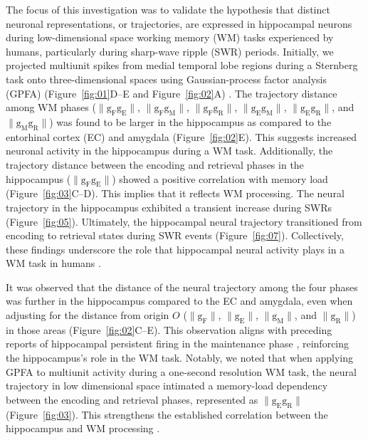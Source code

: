 \documentclass[final,3p,times,twocolumn]{elsarticle}
\begin{document}
The focus of this investigation was to validate the hypothesis that distinct neuronal representations, or trajectories, are expressed in hippocampal neurons during low-dimensional space working memory (WM) tasks experienced by humans, particularly during sharp-wave ripple (SWR) periods. Initially, we projected multiunit spikes from medial temporal lobe regions during a Sternberg task onto three-dimensional spaces using Gaussian-process factor analysis (GPFA) (Figure~\ref{fig:01}D--E and Figure~\ref{fig:02}A) \cite{yu_gaussian-process_2009}. The trajectory distance among WM phases ($\mathrm{\lVert g_{F}g_{E} \rVert}$, $\mathrm{\lVert g_{F}g_{M} \rVert}$, $\mathrm{\lVert g_{F}g_{R} \rVert}$, $\mathrm{\lVert g_{E}g_{M} \rVert}$, $\mathrm{\lVert g_{E}g_{R} \rVert}$, and $\mathrm{\lVert g_{M}g_{R} \rVert}$) was found to be larger in the hippocampus as compared to the entorhinal cortex (EC) and amygdala (Figure~\ref{fig:02}E). This suggests increased neuronal activity in the hippocampus during a WM task. Additionally, the trajectory distance between the encoding and retrieval phases in the hippocampus ($\mathrm{\lVert g_{F}g_{E} \rVert}$) showed a positive correlation with memory load (Figure~\ref{fig:03}C--D). This implies that it reflects WM processing. The neural trajectory in the hippocampus exhibited a transient increase during SWRs (Figure~\ref{fig:05}). Ultimately, the hippocampal neural trajectory transitioned from encoding to retrieval states during SWR events (Figure~\ref{fig:07}). Collectively, these findings underscore the role that hippocampal neural activity plays in a WM task in humans \cite{naber_reciprocal_2001,van_strien_anatomy_2009,strange_functional_2014}.

It was observed that the distance of the neural trajectory among the four phases was further in the hippocampus compared to the EC and amygdala, even when adjusting for the distance from origin $O$ ($\mathrm{\lVert g_{F} \rVert}$, $\mathrm{\lVert g_{E} \rVert}$, $\mathrm{\lVert g_{M} \rVert}$, and $\mathrm{\lVert g_{R} \rVert}$) in those areas (Figure~\ref{fig:02}C--E). This observation aligns with preceding reports of hippocampal persistent firing in the maintenance phase \cite{boran_persistent_2019,kaminski_persistently_2017,kornblith_persistent_2017,faraut_dataset_2018}, reinforcing the hippocampus's role in the WM task. Notably, we noted that when applying GPFA to multiunit activity during a one-second resolution WM task, the neural trajectory in low dimensional space intimated a memory-load dependency between the encoding and retrieval phases, represented as $\mathrm{\lVert g_{E}g_{R} \rVert}$ (Figure~\ref{fig:03}). This strengthens the established correlation between the hippocampus and WM processing \cite{oso_boran_2020}.
\end{document}
